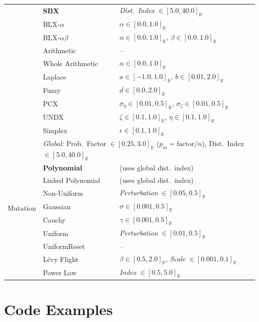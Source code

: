 \documentclass[journal]{IEEEtran}
\newcommand{\Realdomain}[1]{[#1]_{\mathbb{R}}}
\begin{document}
\begin{table}[htbp]
{\begin{tabular}{lll}
 & \textbf{SBX} & \textit{Dist.\ Index} $\in \Realdomain{5.0, 40.0}$ \\
 & BLX-$\alpha$ & $\alpha \in \Realdomain{0.0, 1.0}$ \\
 & BLX-$\alpha\beta$ & $\alpha \in \Realdomain{0.0, 1.0}$, $\beta \in \Realdomain{0.0, 1.0}$ \\
 & Arithmetic & -- \\
 & Whole Arithmetic & $\alpha \in \Realdomain{0.0, 1.0}$ \\
 & Laplace & $a \in \Realdomain{-1.0, 1.0}$, $b \in \Realdomain{0.01, 2.0}$ \\
 & Fuzzy & $d \in \Realdomain{0.0, 2.0}$ \\
 & PCX & $\sigma_\eta \in \Realdomain{0.01, 0.5}$, $\sigma_\zeta \in \Realdomain{0.01, 0.5}$ \\
 & UNDX & $\zeta \in \Realdomain{0.1, 1.0}$, $\eta \in \Realdomain{0.1, 1.0}$ \\
 & Simplex & $\epsilon \in \Realdomain{0.1, 1.0}$ \\ \midrule
\multirow{10}{*}{Mutation} & \multicolumn{2}{l}{\textit{Global:} Prob.\ Factor $\in \Realdomain{0.25, 3.0}$ ($p_m = \text{factor}/n$), Dist.\ Index $\in \Realdomain{5.0, 40.0}$} \\
 & \textbf{Polynomial} & (uses global dist.\ index) \\
 & Linked Polynomial & (uses global dist.\ index) \\
 & Non-Uniform & \textit{Perturbation} $\in \Realdomain{0.05, 0.5}$ \\
 & Gaussian & $\sigma \in \Realdomain{0.001, 0.5}$ \\
 & Cauchy & $\gamma \in \Realdomain{0.001, 0.5}$ \\
 & Uniform & \textit{Perturbation} $\in \Realdomain{0.01, 0.5}$ \\
 & UniformReset & -- \\
 & L\'evy Flight & $\beta \in \Realdomain{0.5, 2.0}$, \textit{Scale} $\in \Realdomain{0.001, 0.1}$ \\
 & Power Law & \textit{Index} $\in \Realdomain{0.5, 5.0}$ \\ \bottomrule
\end{tabular}%
}
\end{table}

\section{Code Examples}
\label{app:code}
\end{document}
